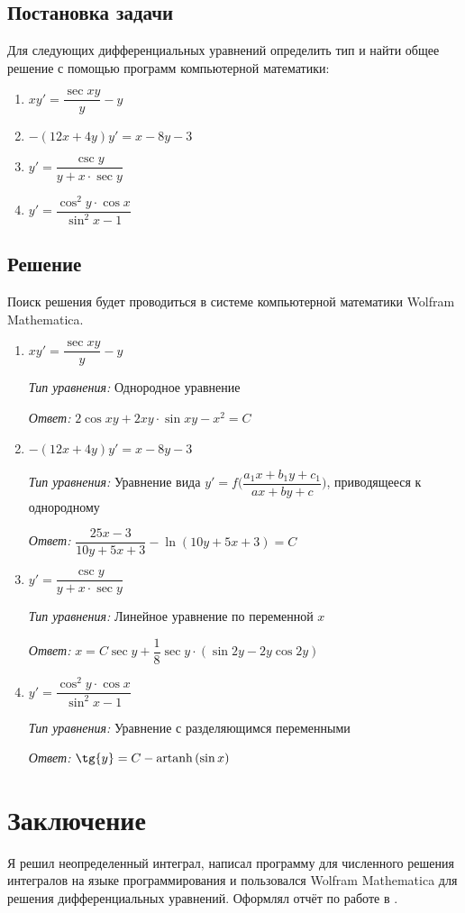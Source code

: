 \documentclass[a4paper, 14pt, titlepage, fleqn]{extarticle}
\DeclareMathOperator\artanh{artanh}
\begin{document}
		\subsection*{Постановка задачи}
		\noindent Для следующих дифференциальных уравнений определить тип и найти общее
		решение с помощью программ компьютерной математики:
		\begin{enumerate}
			\item \( xy' = \dfrac{\sec{xy}}{y} - y \)
			\item \( -(12x + 4y)y' =  x - 8y - 3\)
			\item \( y' = \dfrac{\csc{y}}{y + x \cdot \sec{y}} \)
			\item \( y' = \dfrac{\cos^2{y} \cdot \cos{x}}{\sin^2{x} - 1} \)
		\end{enumerate}
	
	
		\subsection*{Решение}
			\noindent Поиск решения будет проводиться в системе компьютерной математики Wolfram Mathematica.
			\begin{enumerate}
				\item \( xy' = \dfrac{\sec{xy}}{y} - y \)

					\textit{Тип уравнения:} Однородное уравнение
		
					\textit{Ответ:}
					\( 2\cos{xy} + 2xy \cdot \sin{xy} - x^2 = C \)
		
				\item \( -(12x + 4y)y' =  x - 8y - 3\)
		
					\textit{Тип уравнения:} Уравнение вида \( y' = f\bigg(\dfrac{a_1x+b_1y+c_1}{ax+by+c}\bigg) \), приводящееся к однородному
		
					\textit{Ответ:} \( \dfrac{25x-3}{10y+5x+3}-\ln{(10y+5x+3)} = C\)
				\pagebreak
				\item \( y' = \dfrac{\csc{y}}{y + x \cdot \sec{y}} \)
		
					\textit{Тип уравнения:} Линейное уравнение по переменной \( x \)
		
					\textit{Ответ:} \( x = C\sec{y} + \dfrac{1}{8}\sec{y}\cdot(\sin{2y} - 2y\cos{2y}) \)
		
				\item \( y' = \dfrac{\cos^2{y} \cdot \cos{x}}{\sin^2{x} - 1} \)
		
					\textit{Тип уравнения:} Уравнение с разделяющимся переменными
	
					\textit{Ответ:} \( \tg{y} = C - \artanh{(\sin{x})} \)
			\end{enumerate}



	\section*{Заключение}
		\noindent Я решил неопределенный интеграл, написал программу для численного решения интегралов на языке программирования  и пользовался Wolfram Mathematica для решения дифференциальных уравнений. Оформлял отчёт по работе  в .
\end{document}
